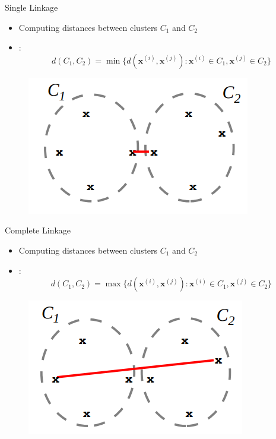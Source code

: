 \begin{frame}{Single Linkage}{}
	\begin{itemize}
		\item Computing distances between clusters $C_1$ and $C_2$
		\item {}:
		\begin{equation*}
			d(C_1, C_2) = \min\{ d(\bm{x}^{(i)}, \bm{x}^{(j)}) : \bm{x}^{(i)} \in C_1, \bm{x}^{(j)} \in C_2 \}
		\end{equation*}
	\end{itemize}

	\begin{figure}
		\centering
		\includegraphics[scale=0.4]{12_clustering/02_img/single_linkage}
	\end{figure}
\end{frame}


\begin{frame}{Complete Linkage}{}
	\begin{itemize}
		\item Computing distances between clusters $C_1$ and $C_2$
		\item {}:
		\begin{equation*}
			d(C_1, C_2) = \max\{ d(\bm{x}^{(i)}, \bm{x}^{(j)}) : \bm{x}^{(i)} \in C_1, \bm{x}^{(j)} \in C_2 \}
		\end{equation*}
	\end{itemize}

	\begin{figure}
		\centering
		\includegraphics[scale=0.4]{12_clustering/02_img/complete_linkage}
	\end{figure}
\end{frame}


